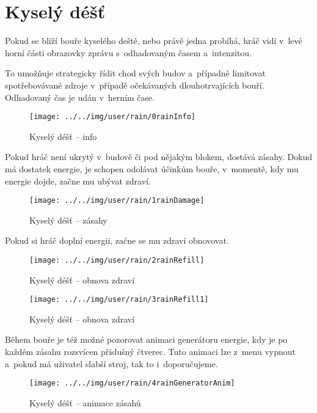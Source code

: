 
\section{Kyselý déšť}

Pokud se blíží bouře kyselého deště, nebo právě jedna probíhá, hráč vidí v~levé horní části obrazovky zprávu s~odhadovaným časem a~intenzitou.

To umožňuje strategicky řídit chod svých budov a~případně limitovat spotřebovávané zdroje v~případě očekávaných dlouhotrvajících bouří. Odhadovaný čas je udán v~herním čase.

\begin{figure}[!ht]\centering
\texttt{[image: ../../img/user/rain/0rainInfo]}

\caption{Kyselý déšť -- info}
\label{fig:user_rain_0rainInfo}

\end{figure}

\FloatBarrier

Pokud hráč není ukrytý v~budově či pod nějakým blokem, dostává zásahy. Dokud má dostatek energie, je schopen odolávat účinkům bouře, v~momentě, kdy mu energie dojde, začne mu ubývat zdraví.


\begin{figure}[!ht]\centering
\texttt{[image: ../../img/user/rain/1rainDamage]}

\caption{Kyselý déšť -- zásahy}
\label{fig:user_rain_1rainDamage}

\end{figure}

\FloatBarrier

Pokud si hráč doplní energii, začne se mu zdraví obnovovat.

\begin{figure}[!ht]\centering
\texttt{[image: ../../img/user/rain/2rainRefill]}

\caption{Kyselý déšť -- obnova zdraví}
\label{fig:user_rain_2rainRefill}

\end{figure}


\begin{figure}[!ht]\centering
\texttt{[image: ../../img/user/rain/3rainRefill1]}

\caption{Kyselý déšť -- obnova zdraví}
\label{fig:user_rain_3rainRefill1}

\end{figure}

\FloatBarrier

Během bouře je též možné pozorovat animaci generátoru energie, kdy je po každém zásahu rozsvícen příslušný čtverec. Tuto animaci lze z~menu vypnout a~pokud má uživatel slabší stroj, tak to i~doporučujeme.

\begin{figure}[!ht]\centering
\texttt{[image: ../../img/user/rain/4rainGeneratorAnim]}

\caption{Kyselý déšť -- animace zásahů}
\label{fig:user_rain_4rainGeneratorAnim}

\end{figure}


\FloatBarrier
